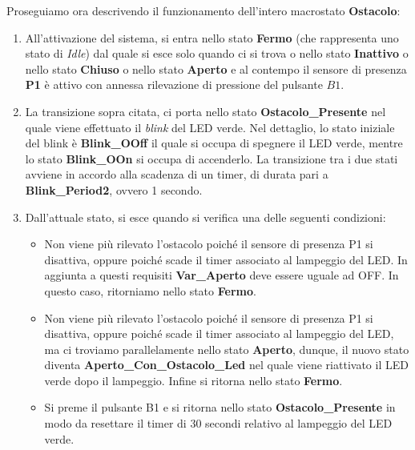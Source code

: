             \noindent Proseguiamo ora descrivendo il funzionamento dell'intero macrostato \textbf{Ostacolo}:
            
            \begin{enumerate}
                \item All'attivazione del sistema, si entra nello stato \textbf{Fermo} (che rappresenta uno stato di \textit{Idle}) dal quale si esce solo quando ci si trova  o nello stato \textbf{Inattivo} o nello stato \textbf{Chiuso} o nello stato \textbf{Aperto} e al contempo il sensore di presenza \textbf{P1} è attivo con annessa rilevazione di pressione del pulsante \textbf{$B1$}.
                
                \item La transizione sopra citata, ci porta nello stato \textbf{Ostacolo\_Presente} nel quale viene effettuato il \textit{blink} del LED verde.
                Nel dettaglio, lo stato iniziale del blink è \textbf{Blink\_OOff} il quale si occupa di spegnere il LED verde, mentre lo stato \textbf{Blink\_OOn} si occupa di accenderlo.
                La transizione tra i due stati avviene in accordo alla scadenza di un timer, di durata pari a \textbf{Blink\_Period2}, ovvero 1 secondo.
                
                \item Dall'attuale stato, si esce quando si verifica una delle seguenti condizioni:
                
                    \begin{itemize}
                        \item Non viene più rilevato l'ostacolo poiché il sensore di presenza P1 si disattiva, oppure poiché scade il timer associato al lampeggio del LED.
                        In aggiunta a questi requisiti \textbf{Var\_Aperto} deve essere uguale ad OFF.
                        In questo caso, ritorniamo nello stato \textbf{Fermo}.
                        
                        \item Non viene più rilevato l'ostacolo poiché il sensore di presenza P1 si disattiva, oppure poiché scade il timer associato al lampeggio del LED, ma ci troviamo parallelamente nello stato \textbf{Aperto}, dunque, il nuovo stato diventa \textbf{Aperto\_Con\_Ostacolo\_Led} nel quale viene riattivato il LED verde dopo il lampeggio.
                        Infine si ritorna nello stato \textbf{Fermo}.
                        \item Si preme il pulsante B1 e si ritorna nello stato \textbf{Ostacolo\_Presente} in modo da resettare il timer di 30 secondi relativo al lampeggio del LED verde.
                    \end{itemize}
            \end{enumerate}



